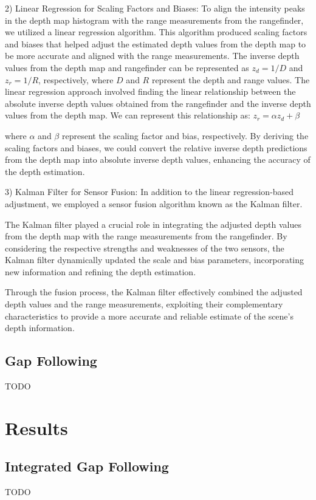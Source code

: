 \documentclass[conference]{IEEEtran}
\begin{document}
2) Linear Regression for Scaling Factors and Biases:
To align the intensity peaks in the depth map histogram with the range measurements from the rangefinder, we utilized a linear regression algorithm. This algorithm produced scaling factors and biases that helped adjust the estimated depth values from the depth map to be more accurate and aligned with the range measurements.
The inverse depth values from the depth map and rangefinder can be represented as $z_{d} = 1/D$ and $z_{r} = 1/R$, respectively, where $D$ and $R$ represent the depth and range values. The linear regression approach involved finding the linear relationship between the absolute inverse depth values obtained from the rangefinder and the inverse depth values from the depth map. We can represent this relationship as:
$z_r=\alpha z_d+\beta$

where $\alpha$ and $\beta$ represent the scaling factor and bias, respectively. By deriving the scaling factors and biases, we could convert the relative inverse depth predictions from the depth map into absolute inverse depth values, enhancing the accuracy of the depth estimation.

3) Kalman Filter for Sensor Fusion:
In addition to the linear regression-based adjustment, we employed a sensor fusion algorithm known as the Kalman filter. 

The Kalman filter played a crucial role in integrating the adjusted depth values from the depth map with the range measurements from the rangefinder. By considering the respective strengths and weaknesses of the two sensors, the Kalman filter dynamically updated the scale and bias parameters, incorporating new information and refining the depth estimation.

Through the fusion process, the Kalman filter effectively combined the adjusted depth values and the range measurements, exploiting their complementary characteristics to provide a more accurate and reliable estimate of the scene's depth information.

\subsection{Gap Following}
TODO

\section{Results}
\subsection{Integrated Gap Following}
TODO
\end{document}
